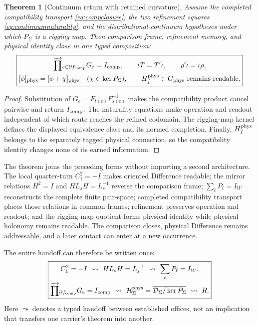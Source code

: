 \documentclass[10pt]{article}
\newtheorem{theorem}{Theorem}
\begin{document}
\begin{theorem}[Continuum return with retained curvature]
Assume the completed compatibility transport
\eqref{eq:compclosure}, the two refinement squares
\eqref{eq:continuumnaturality}, and the distributional-continuum hypotheses
under which $P_\Sigma$ is a rigging map. Then comparison frame, refinement
memory, and physical identity close in one typed composition:
\begin{equation}
\boxed{\begin{gathered}
\overrightarrow{\prod}_{e\in\partial f_{\rm comp}}G_e=I_{\rm comp},
\qquad
\iota T=T'\iota,\qquad \rho'\iota=\bar\iota\rho,\\
[\phi]_{\rm phys}=[\phi+\chi]_{\rm phys}
\quad(\chi\in\ker P_\Sigma),
\qquad H_f^{\rm phys}\in G_{\rm phys}\ \text{remains readable}.
\end{gathered}}
\label{eq:continuumclosure}
\end{equation}
\end{theorem}
\begin{proof}
Substitution of $G_e=F_{t(e)}F_{s(e)}^{-1}$ makes the compatibility product
cancel pairwise and return $I_{\rm comp}$. The naturality equations make
operation and readout independent of which route reaches the refined
codomain. The rigging-map kernel defines the displayed equivalence class and
its normed completion. Finally, $H_f^{\rm phys}$ belongs to the separately
tagged physical connection, so the compatibility identity changes none of
its earned information.
\end{proof}

The theorem joins the preceding forms without importing a second architecture.
The local quarter-turn $C_1^2=-I$ makes oriented Difference readable; the
mirror relations $H^2=I$ and $HL_sH=L_s^{-1}$ reverse the comparison frame;
$\sum_\ell P_\ell=I_W$ reconstructs the complete finite pair-space; completed
compatibility transport places those relations in common frames; refinement
preserves operation and readout; and the rigging-map quotient forms physical
identity while physical holonomy remains readable. The comparison closes,
physical Difference remains addressable, and a later contact can enter at a
new occurrence.

The entire handoff can therefore be written once:
\begin{equation}
\boxed{\begin{gathered}
C_1^2=-I\ \leadsto\ HL_sH=L_s^{-1}
\ \leadsto\ \sum_\ell P_\ell=I_W,\\
\overrightarrow{\prod}_{\partial f_{\rm comp}}G_e=I_{\rm comp}
\ \leadsto\
\mathcal H_\Sigma^{\rm phys}
=\overline{\mathcal D_\Sigma/\ker P_\Sigma}
\ \leadsto\ R.
\end{gathered}}
\label{eq:continuumhandoff}
\end{equation}
Here $\leadsto$ denotes a typed handoff between established offices, not an
implication that transfers one carrier's theorem into another.
\end{document}
